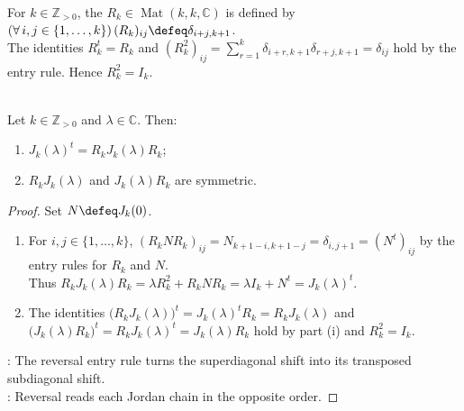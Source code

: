 \begin{definition} \label{def:reversal-matrix} \\
For $k\in\mathbb{Z}_{>0}$, the  $R_k\in\operatorname{Mat}(k,k,\mathbb{C})$ is defined by $(\forall\,i,j\in\{1,\ldots,k\})\,(R_k)_{ij}\defeq\delta_{i+j,k+1}$.\\
The identities $R_k^t=R_k$ and $(R_k^2)_{ij}=\sum_{r=1}^k\delta_{i+r,k+1}\delta_{r+j,k+1}=\delta_{ij}$ hold by the entry rule. Hence $R_k^2=I_k$.
\end{definition}

\begin{lemma} \label{lem:jordan-block-transpose-reversal-similarity} \\
Let $k\in\mathbb{Z}_{>0}$ and $\lambda\in\mathbb{C}$. Then:
\begin{enumerate}[label=(\roman*)]
\setlength{\itemsep}{0pt}
\item $J_k(\lambda)^t=R_kJ_k(\lambda)R_k$;
\item $R_kJ_k(\lambda)$ and $J_k(\lambda)R_k$ are symmetric.
\end{enumerate}
\begin{proof}
Set $N\defeq J_k(0)$.
\begin{enumerate}[label=(\roman*)]
\setlength{\itemsep}{0pt}
\item For $i,j\in\{1,\ldots,k\}$, $(R_kNR_k)_{ij}=N_{k+1-i,k+1-j}=\delta_{i,j+1}=(N^t)_{ij}$ by the entry rules for $R_k$ and $N$.\\
Thus $R_kJ_k(\lambda)R_k=\lambda R_k^2+R_kNR_k=\lambda I_k+N^t=J_k(\lambda)^t$.
\item The identities $\bigl(R_kJ_k(\lambda)\bigr)^t=J_k(\lambda)^tR_k=R_kJ_k(\lambda)$ and $\bigl(J_k(\lambda)R_k\bigr)^t=R_kJ_k(\lambda)^t=J_k(\lambda)R_k$ hold by part (i) and $R_k^2=I_k$.
\end{enumerate}
: The reversal entry rule turns the superdiagonal shift into its transposed subdiagonal shift.\\
: Reversal reads each Jordan chain in the opposite order.
\end{proof}
\end{lemma}

